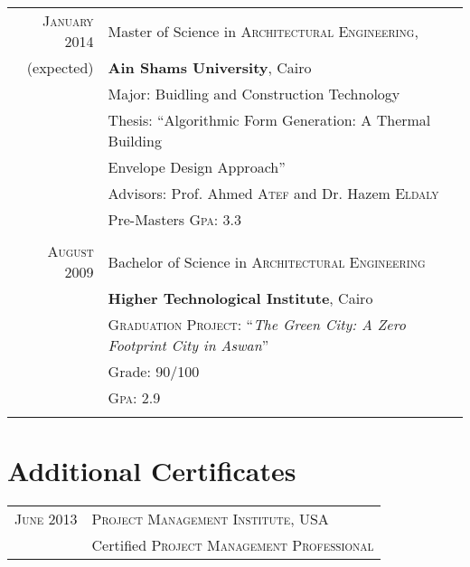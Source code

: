 \documentclass[a4paper,11pt]{article} %
\begin{document}
\begin{tabular}{rl}	
\textsc{January} 2014 & Master of Science in \textsc{Architectural Engineering},\\ 
(expected)&\textbf{Ain Shams University}, Cairo\\
& Major: Buidling and Construction Technology\\
& Thesis: ``Algorithmic Form Generation: A Thermal Building\\
&Envelope Design Approach'' \\
& \small Advisors: Prof. Ahmed \textsc{Atef} and Dr. Hazem \textsc{Eldaly}\\
&\normalsize Pre-Masters \textsc{Gpa}: 3.3\\
&\\


\textsc{August} 2009& Bachelor of Science in \textsc{Architectural Engineering} \\
& \normalsize\textbf{Higher Technological Institute}, Cairo\\
& \textsc{Graduation Project:} ``\emph{The Green City: A Zero Footprint City in Aswan}''\\
&\small Grade: 90/100\\
&\normalsize \textsc{Gpa}: 2.9 \\
&\\

\end{tabular}


\section{Additional Certificates}

\begin{tabular}{rl}
\textsc{June} 2013 & \textsc{Project Management Institute}, USA\\
& Certified \textsc{Project Management Professional}\\

\end{tabular}

\end{document}
